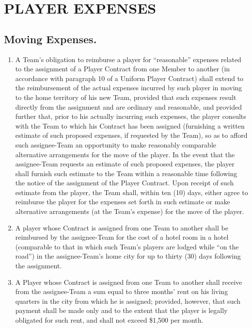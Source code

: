 \documentclass[
]{book}
\providecommand{\tightlist}{%
  \setlength{\itemsep}{0pt}\setlength{\parskip}{0pt}}
\begin{document}
\hypertarget{player-expenses}{%
\chapter{PLAYER EXPENSES}\label{player-expenses}}

\hypertarget{moving-expenses.}{%
\section{Moving Expenses.}\label{moving-expenses.}}

\begin{enumerate}
\def\labelenumi{(\alph{enumi})}
\tightlist
\item
  A Team's obligation to reimburse a player for ``reasonable'' expenses related to the assignment of a Player Contract from one Member to another (in accordance with paragraph 10 of a Uniform Player Contract) shall extend to the reimbursement of the actual expenses incurred by such player in moving to the home territory of his new Team, provided that such expenses result directly from the assignment and are ordinary and reasonable, and provided further that, prior to his actually incurring such expenses, the player consults with the Team to which his Contract has been assigned (furnishing a written estimate of such proposed expenses, if requested by the Team), so as to afford such assignee-Team an opportunity to make reasonably comparable alternative arrangements for the move of the player. In the event that the assignee-Team requests an estimate of such proposed expenses, the player shall furnish such estimate to the Team within a reasonable time following the notice of the assignment of the Player Contract. Upon receipt of such estimate from the player, the Team shall, within ten (10) days, either agree to reimburse the player for the expenses set forth in such estimate or make alternative arrangements (at the Team's expense) for the move of the player.
\item
  A player whose Contract is assigned from one Team to another shall be reimbursed by the assignee-Team for the cost of a hotel room in a hotel (comparable to that in which such Team's players are lodged while ``on the road'') in the assignee-Team's home city for up to thirty (30) days following the assignment.
\item
  A Player whose Contract is assigned from one Team to another shall receive from the assignee-Team a sum equal to three months' rent on his living quarters in the city from which he is assigned; provided, however, that such payment shall be made only and to the extent that the player is legally obligated for such rent, and shall not exceed \$1,500 per month.

\end{enumerate}
\end{document}
